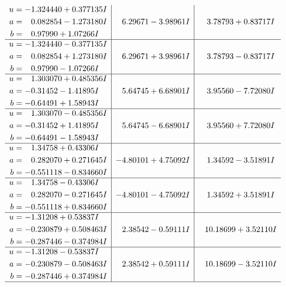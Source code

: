 \documentclass[1p]{elsarticle_modified}
\theoremstyle{definition}
\begin{document}
$$\begin{array}{c|c|c}
\begin{aligned}
u &= -1.324440 + 0.377135 I \\
a &= \phantom{-}0.082854 - 1.273180 I \\
b &= \phantom{-}0.97990 + 1.07266 I\end{aligned}
 & \phantom{-}6.29671 - 3.98961 I & \phantom{-}3.78793 + 0.83717 I \\ \hline\begin{aligned}
u &= -1.324440 - 0.377135 I \\
a &= \phantom{-}0.082854 + 1.273180 I \\
b &= \phantom{-}0.97990 - 1.07266 I\end{aligned}
 & \phantom{-}6.29671 + 3.98961 I & \phantom{-}3.78793 - 0.83717 I \\ \hline\begin{aligned}
u &= \phantom{-}1.303070 + 0.485356 I \\
a &= -0.31452 - 1.41895 I \\
b &= -0.64491 + 1.58943 I\end{aligned}
 & \phantom{-}5.64745 + 6.68901 I & \phantom{-}3.95560 - 7.72080 I \\ \hline\begin{aligned}
u &= \phantom{-}1.303070 - 0.485356 I \\
a &= -0.31452 + 1.41895 I \\
b &= -0.64491 - 1.58943 I\end{aligned}
 & \phantom{-}5.64745 - 6.68901 I & \phantom{-}3.95560 + 7.72080 I \\ \hline\begin{aligned}
u &= \phantom{-}1.34758 + 0.43306 I \\
a &= \phantom{-}0.282070 + 0.271645 I \\
b &= -0.551118 - 0.834660 I\end{aligned}
 & -4.80101 + 4.75092 I & \phantom{-}1.34592 - 3.51891 I \\ \hline\begin{aligned}
u &= \phantom{-}1.34758 - 0.43306 I \\
a &= \phantom{-}0.282070 - 0.271645 I \\
b &= -0.551118 + 0.834660 I\end{aligned}
 & -4.80101 - 4.75092 I & \phantom{-}1.34592 + 3.51891 I \\ \hline\begin{aligned}
u &= -1.31208 + 0.53837 I \\
a &= -0.230879 + 0.508463 I \\
b &= -0.287446 - 0.374984 I\end{aligned}
 & \phantom{-}2.38542 - 0.59111 I & \phantom{-}10.18699 + 3.52110 I \\ \hline\begin{aligned}
u &= -1.31208 - 0.53837 I \\
a &= -0.230879 - 0.508463 I \\
b &= -0.287446 + 0.374984 I\end{aligned}
 & \phantom{-}2.38542 + 0.59111 I & \phantom{-}10.18699 - 3.52110 I\\
 \hline 
 \end{array}$$\newpage
\end{document}
